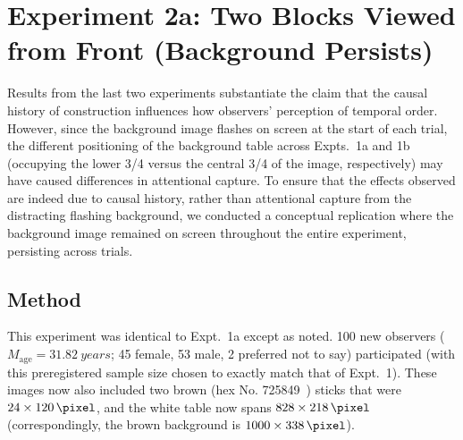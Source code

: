 \section{Experiment 2a:  Two Blocks Viewed from Front (Background Persists)}
Results from the last two experiments substantiate the claim that the causal history of construction influences how observers’ perception of temporal order.  However, since the background image flashes on screen at the start of each trial, the different positioning of the background table across Expts.~1a and 1b (occupying the lower 3/4 versus the central 3/4 of the image, respectively) may have caused differences in attentional capture.  To ensure that the effects observed are indeed due to causal history, rather than attentional capture from the distracting flashing background, we conducted a conceptual replication where the background image remained on screen throughout the entire experiment, persisting across trials.\footnotemark

\subsection{Method}
This experiment was identical to Expt.~1a except as noted.  100 new observers ($M_\text{age}=\qty{31.82}{years}$; 45 female, 53 male, 2 preferred not to say) participated (with this preregistered sample size chosen to exactly match that of Expt.~1).  These images now also included two brown (hex No. 725849~) sticks that were $24 \times \qty{120}{\pixel}$, and the white table now spans $828 \times \qty{218}{\pixel}$ (correspondingly, the brown background is $1000 \times \qty{338}{\pixel}$).

